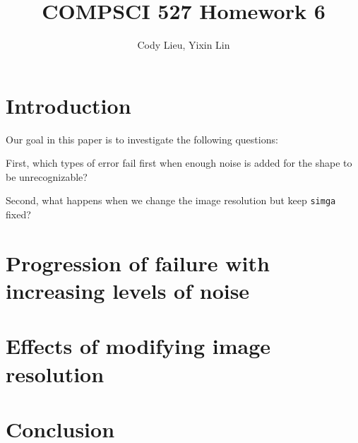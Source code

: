 \documentclass{article}
\author{Cody Lieu, Yixin Lin}
\title{COMPSCI 527 Homework 6}
\begin{document}
\maketitle

\section{Introduction}

Our goal in this paper is to investigate the following questions:

First, which types of error fail first when enough noise is added for the shape to be unrecognizable?

Second, what happens when we change the image resolution but keep \texttt{simga} fixed?

\newpage
\section{Progression of failure with increasing levels of noise}

\newpage
\section{Effects of modifying image resolution}

\newpage
\section{Conclusion}
\end{document}
